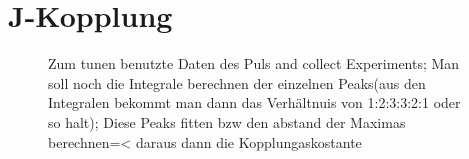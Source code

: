 \section{J-Kopplung}
\begin{figure}[H]
    \centering
    
    \caption{Zum tunen benutzte Daten des Puls and collect Experiments; Man soll noch die Integrale berechnen der einzelnen Peaks(aus den Integralen bekommt man dann das Verhältnuis von 1:2:3:3:2:1 oder so halt); Diese Peaks fitten bzw den abstand der Maximas berechnen=< daraus dann die Kopplungaskostante}
\end{figure}
